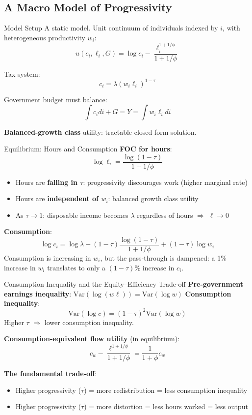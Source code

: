 \documentclass[blue]{beamer}
\begin{document}
\subsection{A Macro Model of Progressivity}

\begin{frame}{Model Setup}
	A static model. Unit continuum of individuals indexed by $i$, with heterogeneous productivity $w_i$:
	\[
	u(c_i, \ell_i, G) = \log c_i - \frac{\ell_i^{1+1/\phi}}{1+1/\phi}
	\]
	
	Tax system: 
	$$
	c_i = \lambda(w_i \ell_i)^{1-\tau}
	$$
	
	Government budget must balance: 
	$$
	\int c_i di + G = Y = \int w_i \ell_i di
	$$
	
	\bigskip
	\textbf{Balanced-growth class} utility: tractable closed-form solution.
\end{frame}


\begin{frame}{Equilibrium: Hours and Consumption}
	\textbf{FOC for hours}:
	\[
	\log \ell_i = \frac{\log(1-\tau)}{1+1/\phi}
	\]
	\begin{itemize}
		\item Hours are \textbf{falling in $\tau$}: progressivity discourages work (higher marginal rate)
		\item Hours are \textbf{independent of $w_i$}: balanced growth class utility
		\item As $\tau \to 1$: disposable income becomes $\lambda$ regardless of hours $\Rightarrow$ $\ell \to 0$
	\end{itemize}

	\textbf{Consumption}:
	\[
	\log c_i = \log\lambda + (1-\tau)\frac{\log(1-\tau)}{1+1/\phi} + (1-\tau)\log w_i
	\]
	Consumption is increasing in $w_i$, but the pass-through is dampened: a 1\% increase in $w_i$ translates to only a $(1-\tau)\%$ increase in $c_i$.
\end{frame}
\begin{frame}{Consumption Inequality and the Equity--Efficiency Trade-off}
	\textbf{Pre-government earnings inequality}: $\text{Var}(\log(w\ell)) = \text{Var}(\log w)$	
	\textbf{Consumption inequality}:
	\[
	\text{Var}(\log c) = (1-\tau)^2 \text{Var}(\log w)
	\]
		Higher $\tau$ $\Rightarrow$ lower consumption inequality.
	

	\textbf{Consumption-equivalent flow utility} (in equilibrium):
	\[
	c_w - \frac{\ell^{1+1/\phi}}{1+1/\phi} = \frac{1}{1+\phi} c_w
	\]
	
	\textbf{The fundamental trade-off}:
	\begin{itemize}
		\item Higher progressivity ($\tau$) = more redistribution = less consumption inequality
		\item Higher progressivity ($\tau$) = more distortion = less hours worked = less output
	\end{itemize}

\end{frame}
\end{document}
